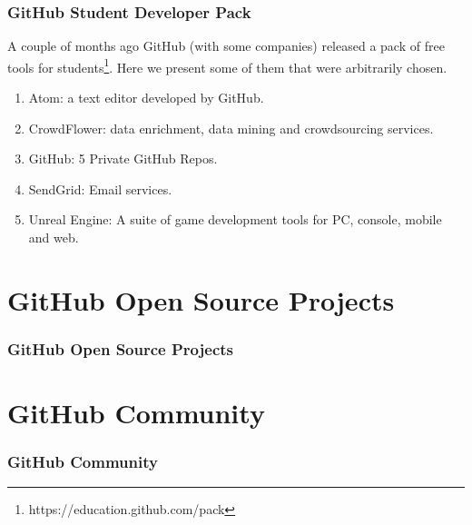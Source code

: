 \begin{frame}
    \frametitle{GitHub Student Developer Pack}
      
    A couple of months ago GitHub (with some companies) released a pack of free tools for students\footnote{https://education.github.com/pack}. Here we present some of them that were arbitrarily chosen.
    
    \begin{enumerate}    
    \item Atom: a text editor developed by GitHub. \pause
    
    \item CrowdFlower: data enrichment, data mining and crowdsourcing services. \pause
    
    \item GitHub: 5 Private GitHub Repos. \pause
    
    \item SendGrid: Email services. \pause
    
    \item Unreal Engine: A suite of game development tools for PC, console, mobile and web.
    \end{enumerate}

\end{frame}
    

\section[Open Source]{GitHub Open Source Projects}
\begin{frame}
    \frametitle{GitHub Open Source Projects}
\end{frame}


\section[GitHub Community]{GitHub Community}
\begin{frame}
    \frametitle{GitHub Community}
\end{frame}

